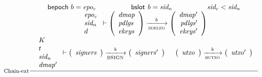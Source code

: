 \begin{figure}
  \begin{equation}
    \label{eq:rule:chain-extension}
    \inference[Chain-ext]
    { \fun{bepoch}~b = \var{epo_c}
      & \bslot{b} = \var{sid_n} 
      & \var{sid_c} < \var{sid_n} \\
      {\begin{array}{l}
         \var{epo_c}\\
         \var{sid_n}\\
         d
       \end{array}}
      \vdash
      {
        \left(
          \begin{array}{l}
            \var{dmap}\\
            \var{pdlgs}\\
            \var{ekeys}
          \end{array}
        \right)
      }
      \trans{bdeleg}{b}
      {
        \left(
          \begin{array}{r}
            \var{dmap'}\\
            \var{pdlgs'}\\
            \var{ekeys'}
          \end{array}
        \right)
      }
      \\
      {\begin{array}{l}
         K\\
         t\\
         \var{sid_n}\\
         \var{dmap'}
      \end{array}}
      \vdash
      {
        \left(
          \begin{array}{l}
            \var{signers}
          \end{array}
        \right)
      }
      \trans{BSIGN}{b}
      {
        \left(
          \begin{array}{l}
            \var{signers'}
          \end{array}
        \right)
      }      
      &
      {
        \left(
          \begin{array}{l}
            \var{utxo}\\
          \end{array}
        \right)
      }
      \trans{butxo}{b}
      {
        \left(
          \begin{array}{r}
            \var{utxo'}\\
          \end{array}
        \right)
      }
    }
    {
      {\begin{array}{l}

\end{array}}}
\end{equation}
\end{figure}
